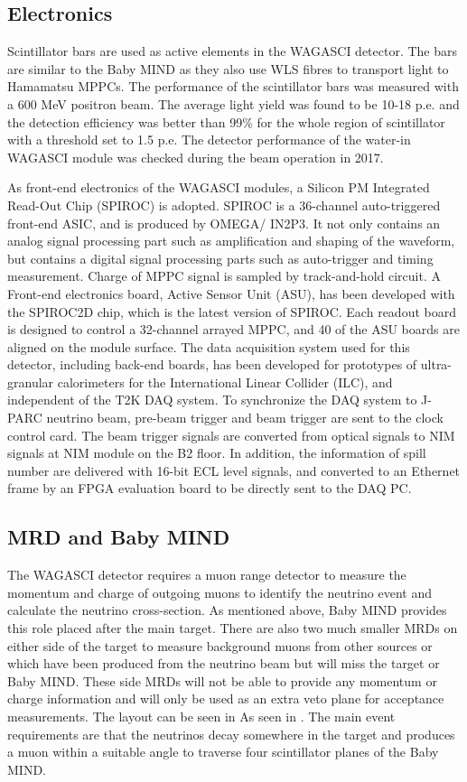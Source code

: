 \subsection{Electronics}

Scintillator bars are used as active elements in the WAGASCI detector. The bars are similar to the Baby MIND as they also use WLS fibres to transport light to Hamamatsu MPPCs. The performance of the scintillator bars was measured with a 600 MeV positron beam. The average light yield was found to be 10-18 p.e. and the detection efficiency was better than 99\% for the whole region of scintillator with a threshold set to 1.5 p.e.  The detector performance of the water-in WAGASCI module was checked during the beam operation in 2017.

As front-end electronics of the WAGASCI modules, a Silicon PM Integrated Read-Out Chip (SPIROC) is adopted.
SPIROC is a 36-channel auto-triggered front-end ASIC, and is produced by OMEGA/ IN2P3. 
It not only contains an analog signal processing part such as amplification and shaping of the waveform, but contains a digital signal processing parts such as auto-trigger and timing measurement.
Charge of MPPC signal is sampled by track-and-hold circuit.
A Front-end electronics board, Active Sensor Unit (ASU), has been developed with the SPIROC2D chip, which is the latest version of SPIROC. 
Each readout board is designed to control a 32-channel arrayed MPPC, and 40 of the ASU boards are aligned on the module surface. 
The data acquisition system used for this detector, including back-end boards, has been developed for prototypes of ultra-granular calorimeters for the International Linear Collider (ILC), and independent of the T2K DAQ system.
To synchronize the DAQ system to J- PARC neutrino beam, pre-beam trigger and beam trigger are sent to the clock control card.
The beam trigger signals are converted from optical signals to NIM signals at NIM module on the B2 floor.
In addition, the information of spill number are delivered with 16-bit ECL level signals, and converted to an Ethernet frame by an FPGA evaluation board to be directly sent to the DAQ PC.

\subsection{MRD and Baby MIND}
The WAGASCI detector requires a muon range detector to measure the momentum and charge of outgoing muons to identify the neutrino event and calculate the neutrino cross-section. As mentioned above, Baby MIND provides this role placed after the main target. There are also two much smaller MRDs on either side of the target to measure background muons from other sources or which have been produced from the neutrino beam but will miss the target or Baby MIND. These side MRDs will not be able to provide any momentum or charge information and will only be used as an extra veto plane for acceptance measurements. The layout can be seen in As seen in . The main event requirements are that the neutrinos decay somewhere in the target and produces a muon within a suitable angle to traverse four scintillator planes of the Baby MIND.

